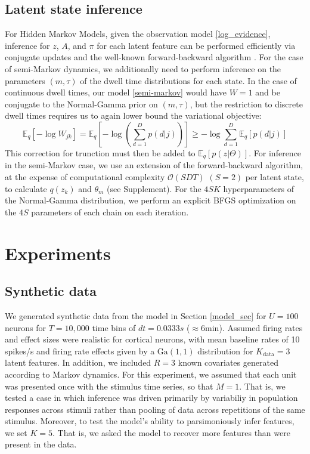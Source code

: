 \documentclass{article} %
\begin{document}
\subsection{Latent state inference}
For Hidden Markov Models, given the observation model \ref{log_evidence}, inference for $z$, $A$, and $\pi$ for each latent feature can be performed efficiently via conjugate updates and the well-known forward-backward algorithm \cite{beal2003variational}. For the case of semi-Markov dynamics, we additionally need to perform inference on the parameters $(m, \tau)$ of the dwell time distributions for each state. In the case of continuous dwell times, our model \ref{semi-markov} would have $W = 1$ and be conjugate to the Normal-Gamma prior on $(m, \tau)$, but the restriction to discrete dwell times requires us to again lower bound the variational objective:
\begin{equation}
    \mathbb{E}_q\left[-\log W_{jk} \right] = 
    \mathbb{E}_q\left[- \log \left( \sum_{d=1}^D p(d|j)\right) \right]
    \ge -\log \sum_{d = 1}^D \mathbb{E}_q\left[p(d|j)\right]
\end{equation}
This correction for trunction must then be added to $\mathbb{E}_q[p(z|\Theta)]$. For inference in the semi-Markov case, we use an extension of the forward-backward algorithm\cite{Yu2006-bb}, at the expense of computational complexity $\mathcal{O}(SDT)$ $(S = 2)$ per latent state, to calculate $q(z_k)$ and $\theta_m$ (see Supplement). For the $4SK$ hyperparameters of the Normal-Gamma distribution, we perform an explicit BFGS optimization on the $4S$ parameters of each chain on each iteration.

\section{Experiments}
\subsection{Synthetic data}
We generated synthetic data from the model in Section \ref{model_sec} for $U=100$ neurons for $T=10,000$ time bins of $dt=0.0333s$ ($\approx 6$min). Assumed firing rates and effect sizes were realistic for cortical neurons, with mean baseline rates of 10 spikes/s and firing rate effects given by a $\text{Ga}(1, 1)$ distribution for $K_{\text{data}}=3$ latent features. In addition, we included $R=3$ known covariates generated according to Markov dynamics. For this experiment, we assumed that each unit was presented once with the stimulus time series, so that $M = 1$. That is, we tested a case in which inference was driven primarily by variabiliy in population responses across stimuli rather than pooling of data across repetitions of the same stimulus. Moreover, to test the model's ability to parsimoniously infer features, we set $K=5$. That is, we asked the model to recover more features than were present in the data.
\end{document}
